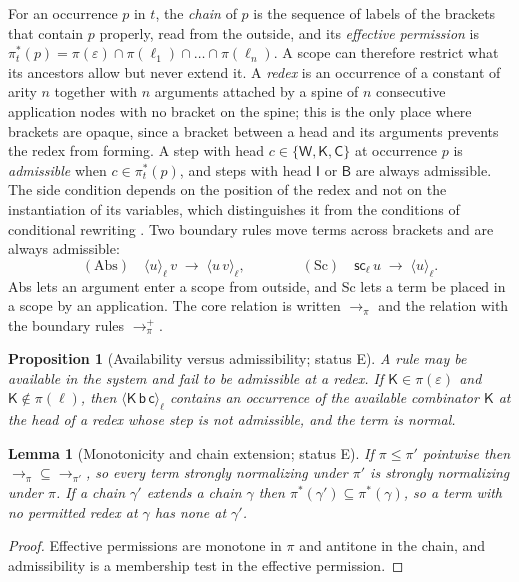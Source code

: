 \documentclass[11pt]{article}
\newtheorem{proposition}[theorem]{Proposition}
\newtheorem{lemma}[theorem]{Lemma}
\theoremstyle{definition}
\theoremstyle{remark}
\newcommand{\cI}{\mathsf{I}}
\newcommand{\cB}{\mathsf{B}}
\newcommand{\cC}{\mathsf{C}}
\newcommand{\cK}{\mathsf{K}}
\newcommand{\cW}{\mathsf{W}}
\newcommand{\br}[2]{\langle #1\rangle_{#2}}
\newcommand{\sca}[1]{\mathsf{sc}_{#1}}
\newcommand{\Et}{status E}
\begin{document}
For an occurrence $p$ in $t$, the \emph{chain} of $p$ is the sequence of labels of the brackets that contain $p$ properly, read from the outside, and its \emph{effective permission} is $\pi^{\ast}_t(p)=\pi(\varepsilon)\cap\pi(\ell_1)\cap\dots\cap\pi(\ell_n)$. A scope can therefore restrict what its ancestors allow but never extend it. A \emph{redex} is an occurrence of a constant of arity $n$ together with $n$ arguments attached by a spine of $n$ consecutive application nodes with no bracket on the spine; this is the only place where brackets are opaque, since a bracket between a head and its arguments prevents the redex from forming. A step with head $c\in\{\cW,\cK,\cC\}$ at occurrence $p$ is \emph{admissible} when $c\in\pi^{\ast}_t(p)$, and steps with head $\cI$ or $\cB$ are always admissible. The side condition depends on the position of the redex and not on the instantiation of its variables, which distinguishes it from the conditions of conditional rewriting \citep{meseguer1992}. Two boundary rules move terms across brackets and are always admissible:
\[
(\mathrm{Abs})\quad\br u\ell\,v\;\to\;\br{u\,v}\ell,\qquad\qquad
(\mathrm{Sc})\quad\sca\ell\,u\;\to\;\br u\ell .
\]
Abs lets an argument enter a scope from outside, and Sc lets a term be placed in a scope by an application. The core relation is written $\to_\pi$ and the relation with the boundary rules $\to_\pi^{+}$.

\begin{proposition}[Availability versus admissibility; \Et]\label{prop:avail}
A rule may be available in the system and fail to be admissible at a redex. If $\cK\in\pi(\varepsilon)$ and $\cK\notin\pi(\ell)$, then $\br{\cK\,\mathsf b\,\mathsf c}\ell$ contains an occurrence of the available combinator $\cK$ at the head of a redex whose step is not admissible, and the term is normal.
\end{proposition}

\begin{lemma}[Monotonicity and chain extension; \Et]\label{lem:mono}
If $\pi\le\pi'$ pointwise then $\to_\pi\subseteq\to_{\pi'}$, so every term strongly normalizing under $\pi'$ is strongly normalizing under $\pi$. If a chain $\gamma'$ extends a chain $\gamma$ then $\pi^{\ast}(\gamma')\subseteq\pi^{\ast}(\gamma)$, so a term with no permitted redex at $\gamma$ has none at $\gamma'$.
\end{lemma}

\begin{proof}
Effective permissions are monotone in $\pi$ and antitone in the chain, and admissibility is a membership test in the effective permission.
\end{proof}
\end{document}

